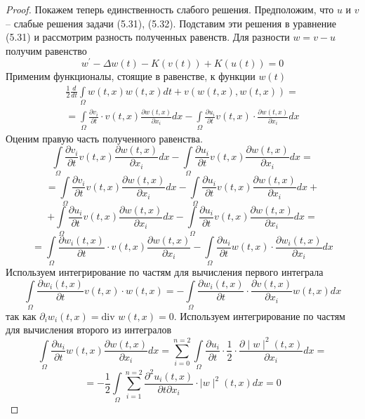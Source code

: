 \begin{proof}
    Покажем теперь единственность слабого решения. Предположим, что $u$ и $v$ -- слабые решения задачи (5.31), (5.32).
    Подставим эти решения в уравнение (5.31) и рассмотрим разность полученных равенств. Для разности $w = v - u$ получим равенство
    $$w^\prime - \Delta w(t) - K(v(t)) + K(u(t)) = 0$$
    Применим функционалы, стоящие в равенстве, к функции $w(t)$
    \begin{equation}\label{eq:5.36}
        \begin{gathered}
            \frac{1}{2}\frac{d}{dt}\int\limits_\Omega w(t, x)w(t, x)dt+v(w(t, x),w(t, x))= \\
            =\int\limits_\Omega\frac{\partial v_i}{\partial t}\cdot v(t, x)\frac{\partial w(t, x)}{\partial x_i}dx-\int\limits_\Omega\frac{\partial u_i}{\partial t}v(t, x)\cdot\frac{\partial w(t, x)}{\partial x_i}dx
        \end{gathered}
    \end{equation}
    Оценим правую часть полученного равенства.
    $$\int\limits_\Omega\frac{\partial v_i}{\partial t}v(t, x)\frac{\partial w(t, x)}
    {\partial x_i}dx-\int\limits_\Omega\frac{\partial u_i}{\partial t}v(t, x)\frac{\partial w(t, x)}{\partial x_i}dx=$$
    $$=\int\limits_\Omega\frac{\partial v_i}{\partial t}v(t, x)\frac{\partial w(t, x)}
    {\partial x_i}dx-\int\limits_\Omega\frac{\partial u_i}{\partial t}v(t, x)\frac{\partial w(t, x)}{\partial x_i}dx+$$
    $$+\int\limits_\Omega\frac{\partial u_i}{\partial t}v(t, x)\frac{\partial w(t, x)}
    {\partial x_i}dx-\int\limits_\Omega\frac{\partial u_i}{\partial t}v(t, x)\frac{\partial w(t, x)}{\partial x_i}dx=$$
    $$=\int\limits_\Omega\frac{\partial w_i(t, x)}{\partial t}\cdot v(t, x)\frac{\partial w(t, x)}
    {\partial x_i}-\int\limits_\Omega\frac{\partial u_i}{\partial t}w(t, x)\cdot\frac{\partial w_i(t, x)}{\partial x_i}dx$$
    Используем интегрирование по частям для вычисления первого интеграла
    $$\int\limits_\Omega\frac{\partial w_i(t, x)}{\partial t}v(t, x)\cdot w(t, x)=
    -\int\limits_\Omega\frac{\partial w_i(t, x)}{\partial t}\cdot\frac{\partial v(t, x)}{\partial x_i}w(t, x)dx$$
    так как $\partial_iw_i(t, x) = \textrm{div } w(t, x)=0$. Используем интегрирование по частям для вычисления второго из интегралов
    $$\int\limits_\Omega\frac{\partial u_i}{\partial t}w(t, x)\frac{\partial w(t, x)}{\partial x_i}dx=
    \sum_{i=0}^{n=2}\int\limits_\Omega\frac{\partial u_i}{\partial t}\cdot\frac{1}{2}\cdot\frac{\partial \mid w\mid^2(t, x)}{\partial x_i}dx=$$
    $$=-\frac{1}{2}\int\limits_\Omega\sum_{i=1}^{n=2}\frac{\partial^2 u_i(t, x)}{\partial t\partial x_i}\cdot\mid w\mid^2(t, x)dx=0$$

\end{proof}
